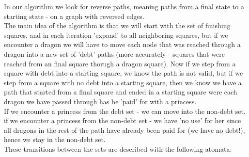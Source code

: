\documentclass{article}
\begin{document}
In our algorithm we look for reverse paths, meaning paths from
a final state to a starting state - on a graph with reversed edges.\\

The main idea of the algorithm is that we will start with the
set of finishing squares,
and in each iteration 'expand' to all neighboring squares,
but if we encounter a dragon we will have to move
each node that was reached through a dragon into a new
set of 'debt' paths (more accurately - squares that were reached from an final square thorugh
a dragon square). Now if we step from a square with debt into
a starting square, we know the path is not valid, but if
we step from a square with no debt into a starting square,
then we know we have a path that started from a final square
and ended in a starting square were each dragon we have passed through
has be 'paid' for with a princess.\\
If we encounter a princess from the debt set - we can
move into the non-debt set,
if we encounter a princess from the non-debt set - 
we have 'no use' for her since all dragons
in the rest of the path have already been paid for (we have no debt!),
hence we stay in the non-debt set.\\

These transitions between the sets are described with the following atomata:\\

\begin{center}
\end{center}
\end{document}

